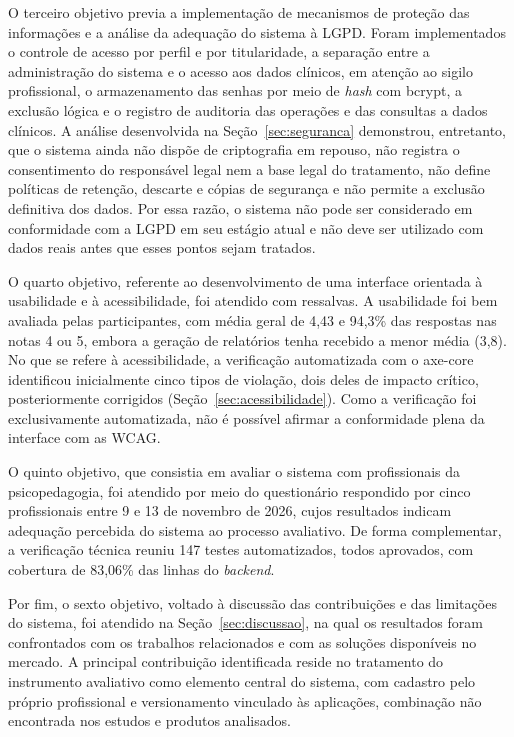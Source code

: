 O terceiro objetivo previa a implementação de mecanismos de proteção das informações e a análise da adequação do sistema à LGPD. Foram implementados o controle de acesso por perfil e por titularidade, a separação entre a administração do sistema e o acesso aos dados clínicos, em atenção ao sigilo profissional, o armazenamento das senhas por meio de \textit{hash} com bcrypt, a exclusão lógica e o registro de auditoria das operações e das consultas a dados clínicos. A análise desenvolvida na Seção~\ref{sec:seguranca} demonstrou, entretanto, que o sistema ainda não dispõe de criptografia em repouso, não registra o consentimento do responsável legal nem a base legal do tratamento, não define políticas de retenção, descarte e cópias de segurança e não permite a exclusão definitiva dos dados. Por essa razão, o sistema não pode ser considerado em conformidade com a LGPD em seu estágio atual e não deve ser utilizado com dados reais antes que esses pontos sejam tratados.

O quarto objetivo, referente ao desenvolvimento de uma interface orientada à usabilidade e à acessibilidade, foi atendido com ressalvas. A usabilidade foi bem avaliada pelas participantes, com média geral de 4,43 e 94,3\% das respostas nas notas 4 ou 5, embora a geração de relatórios tenha recebido a menor média (3,8). No que se refere à acessibilidade, a verificação automatizada com o axe-core identificou inicialmente cinco tipos de violação, dois deles de impacto crítico, posteriormente corrigidos (Seção~\ref{sec:acessibilidade}). Como a verificação foi exclusivamente automatizada, não é possível afirmar a conformidade plena da interface com as WCAG.

O quinto objetivo, que consistia em avaliar o sistema com profissionais da psicopedagogia, foi atendido por meio do questionário respondido por cinco profissionais entre 9 e 13 de novembro de 2026, cujos resultados indicam adequação percebida do sistema ao processo avaliativo. De forma complementar, a verificação técnica reuniu 147 testes automatizados, todos aprovados, com cobertura de 83,06\% das linhas do \textit{backend}.

Por fim, o sexto objetivo, voltado à discussão das contribuições e das limitações do sistema, foi atendido na Seção~\ref{sec:discussao}, na qual os resultados foram confrontados com os trabalhos relacionados e com as soluções disponíveis no mercado. A principal contribuição identificada reside no tratamento do instrumento avaliativo como elemento central do sistema, com cadastro pelo próprio profissional e versionamento vinculado às aplicações, combinação não encontrada nos estudos e produtos analisados.

